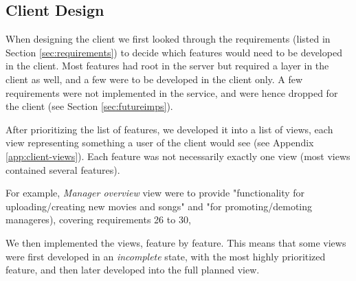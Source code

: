 \subsection{Client Design}

When designing the client we first looked through the requirements (listed in
Section \ref{sec:requirements}) to decide which features would need to be
developed in the client. Most features had root in the server but required a
layer in the client as well, and a few were to be developed in the client only.
A few requirements were not implemented in the service, and were hence dropped
for the client (see Section \ref{sec:futureimps}).

After prioritizing the list of features, we developed it into a list of views,
each view representing something a user of the client would see (see Appendix
\ref{app:client-views}). Each feature was not necessarily exactly one view (most
views contained several features).

For example, \emph{Manager overview} view were to provide "functionality for
uploading/creating new movies and songs" and "for promoting/demoting
manageres), covering requirements 26 to 30,

We then implemented the views, feature by feature. This means that some views
were first developed in an \emph{incomplete} state, with the most highly
prioritized feature, and then later developed into the full planned view.


